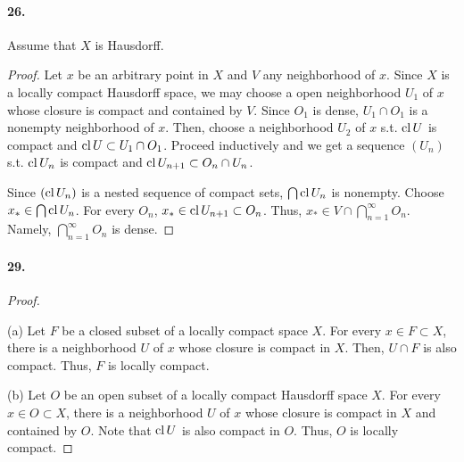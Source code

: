 \paragraph{26.}
  Assume that $X$ is Hausdorff.
\begin{proof}
  Let $x$ be an arbitrary point in $X$ and $V$ any neighborhood of $x$. Since 
  $X$ is a locally compact Hausdorff space, we may choose a open neighborhood
  $U_1$ of $x$ whose closure is compact and contained by $V$. Since $O_1$ is
  dense, $U_1\cap O_1$ is a nonempty neighborhood of $x$. Then, choose a 
  neighborhood $U_2$ of $x$ s.t. $\operatorname{cl} U$ is compact and $\operatorname{cl} U \subset 
  U_1\cap O_1$. Proceed inductively and we get a sequence $(U_n)$ s.t.
  $\operatorname{cl} U_n$ is compact and $\operatorname{cl} U_{n+1} \subset O_n\cap U_n$.
  
  Since $(\operatorname{cl} U_n)$ is a nested sequence of compact sets, $\bigcap \operatorname{cl} U_n$
  is nonempty. Choose $x_* \in \bigcap\operatorname{cl} U_n$. For every $O_n$, $x_*
  \in \operatorname{cl} U_{n+1} \subset O_n$. Thus, $x_* \in V\cap\bigcap_{n=1}^\infty O_n$.
  Namely, $\bigcap_{n=1}^\infty O_n$ is dense.
\end{proof}

\paragraph{29.}
\begin{proof}
  $\,$\par
  (a) Let $F$ be a closed subset of a locally compact space $X$. For every 
  $x\in F\subset X$, there is a neighborhood $U$ of $x$ whose closure is 
  compact in $X$. Then, $U\cap F$ is also compact. Thus, $F$ is locally
  compact.
  
  (b) Let $O$ be an open subset of a locally compact Hausdorff space $X$. For
  every $x\in O \subset X$, there is a neighborhood $U$ of $x$ whose closure is
  compact in $X$ and contained by $O$. Note that $\operatorname{cl} U$ is also compact in
  $O$. Thus, $O$ is locally compact.
\end{proof}
















